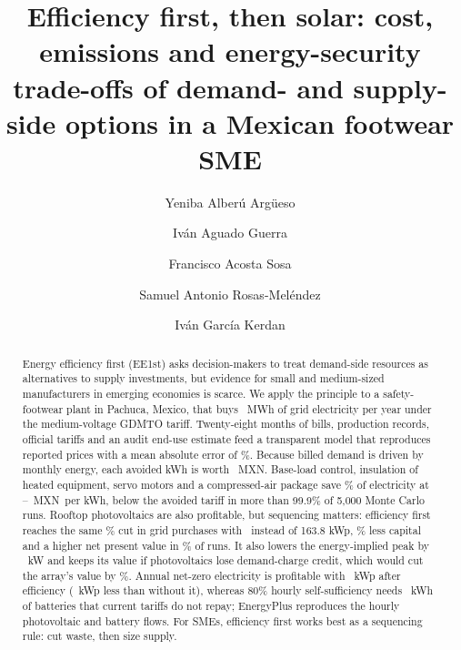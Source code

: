 \documentclass[preprint,12pt,authoryear]{elsarticle}
\newcommand{\MXN}{MXN}
\begin{document}
\begin{frontmatter}

\title{Efficiency first, then solar: cost, emissions and energy-security trade-offs of demand- and supply-side options in a Mexican footwear SME}

\author[tec]{Yeniba Alberú Argüeso}
\author[tec]{Iván Aguado Guerra}
\author[tec]{Francisco Acosta Sosa}
\author[tec]{Samuel Antonio Rosas-Meléndez}
\author[tec]{Iván García Kerdan}


\begin{abstract}
Energy efficiency first (EE1st) asks decision-makers to treat demand-side resources as alternatives to supply investments, but evidence for small and medium-sized manufacturers in emerging economies is scarce. We apply the principle to a safety-footwear plant in Pachuca, Mexico, that buys \nRefMWh\ MWh of grid electricity per year under the medium-voltage GDMTO tariff. Twenty-eight months of bills, production records, official tariffs and an audit end-use estimate feed a transparent model that reproduces reported prices with a mean absolute error of \nTVMape\%. Because billed demand is driven by monthly energy, each avoided kWh is worth \nTMarg\ \MXN. Base-load control, insulation of heated equipment, servo motors and a compressed-air package save \nEESavedPct\% of electricity at \nCCEBase--\nCCECA\ \MXN\ per kWh, below the avoided tariff in more than 99.9\% of 5,000 Monte Carlo runs. Rooftop photovoltaics are also profitable, but sequencing matters: efficiency first reaches the same \nGridTwo\% cut in grid purchases with \nKWpFour\ instead of 163.8 kWp, \nCapexSaveFour\% less capital and a higher net present value in \nProbFourTwo\% of runs. It also lowers the energy-implied peak by \nPeakCutOne\ kW and keeps its value if photovoltaics lose demand-charge credit, which would cut the array's value by \nPVStressDrop\%. Annual net-zero electricity is profitable with \nKWpNZE\ kWp after efficiency (\nNZKWpSave\ kWp less than without it), whereas 80\% hourly self-sufficiency needs \nBatSSE\ kWh of batteries that current tariffs do not repay; EnergyPlus reproduces the hourly photovoltaic and battery flows. For SMEs, efficiency first works best as a sequencing rule: cut waste, then size supply.
\end{abstract}


\end{frontmatter}
\end{document}
